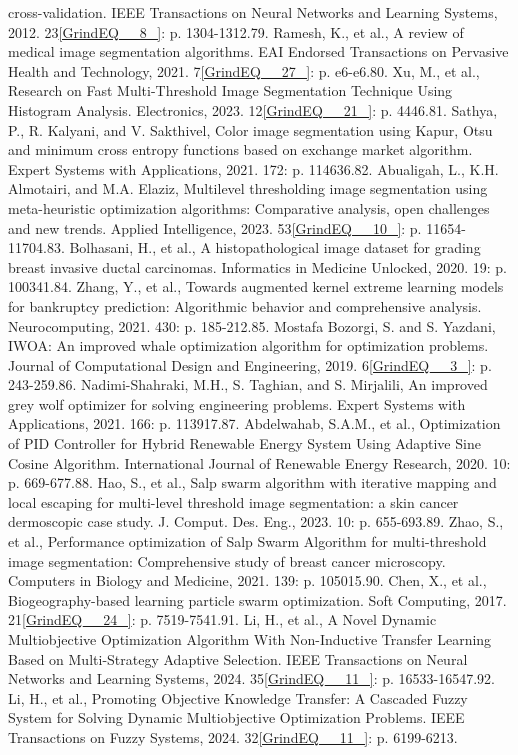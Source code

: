\documentclass{article} %
\begin{document}
cross-validation. IEEE Transactions on Neural Networks and Learning Systems, 2012. 23\eqref{GrindEQ__8_}: p. 1304-1312.79. Ramesh, K., et al., A review of medical image segmentation algorithms. EAI Endorsed Transactions on Pervasive Health and Technology, 2021. 7\eqref{GrindEQ__27_}: p. e6-e6.80. Xu, M., et al., Research on Fast Multi-Threshold Image Segmentation Technique Using Histogram Analysis. Electronics, 2023. 12\eqref{GrindEQ__21_}: p. 4446.81. Sathya, P., R. Kalyani, and V. Sakthivel, Color image segmentation using Kapur, Otsu and minimum cross entropy functions based on exchange market algorithm. Expert Systems with Applications, 2021. 172: p. 114636.82. Abualigah, L., K.H. Almotairi, and M.A. Elaziz, Multilevel thresholding image segmentation using meta-heuristic optimization algorithms: Comparative analysis, open challenges and new trends. Applied Intelligence, 2023. 53\eqref{GrindEQ__10_}: p. 11654-11704.83. Bolhasani, H., et al., A histopathological image dataset for grading breast invasive ductal carcinomas. Informatics in Medicine Unlocked, 2020. 19: p. 100341.84. Zhang, Y., et al., Towards augmented kernel extreme learning models for bankruptcy prediction: Algorithmic behavior and comprehensive analysis. Neurocomputing, 2021. 430: p. 185-212.85. Mostafa Bozorgi, S. and S. Yazdani, IWOA: An improved whale optimization algorithm for optimization problems. Journal of Computational Design and Engineering, 2019. 6\eqref{GrindEQ__3_}: p. 243-259.86. Nadimi-Shahraki, M.H., S. Taghian, and S. Mirjalili, An improved grey wolf optimizer for solving engineering problems. Expert Systems with Applications, 2021. 166: p. 113917.87. Abdelwahab, S.A.M., et al., Optimization of PID Controller for Hybrid Renewable Energy System Using Adaptive Sine Cosine Algorithm. International Journal of Renewable Energy Research, 2020. 10: p. 669-677.88. Hao, S., et al., Salp swarm algorithm with iterative mapping and local escaping for multi-level threshold image segmentation: a skin cancer dermoscopic case study. J. Comput. Des. Eng., 2023. 10: p. 655-693.89. Zhao, S., et al., Performance optimization of Salp Swarm Algorithm for multi-threshold image segmentation: Comprehensive study of breast cancer microscopy. Computers in Biology and Medicine, 2021. 139: p. 105015.90. Chen, X., et al., Biogeography-based learning particle swarm optimization. Soft Computing, 2017. 21\eqref{GrindEQ__24_}: p. 7519-7541.91. Li, H., et al., A Novel Dynamic Multiobjective Optimization Algorithm With Non-Inductive Transfer Learning Based on Multi-Strategy Adaptive Selection. IEEE Transactions on Neural Networks and Learning Systems, 2024. 35\eqref{GrindEQ__11_}: p. 16533-16547.92. Li, H., et al., Promoting Objective Knowledge Transfer: A Cascaded Fuzzy System for Solving Dynamic Multiobjective Optimization Problems. IEEE Transactions on Fuzzy Systems, 2024. 32\eqref{GrindEQ__11_}: p. 6199-6213.

\noindent 

\noindent 
\end{document}
